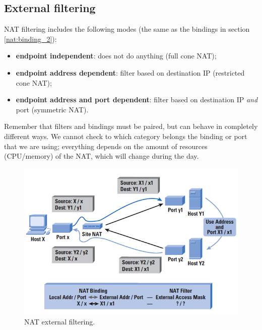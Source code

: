 
\subsection{External filtering}
NAT filtering includes the following modes (the same as the bindings in section \ref{nat:binding_2}):

\begin{itemize}
    \item \textbf{endpoint independent}: does not do anything (full cone NAT);
    \item \textbf{endpoint address dependent}: filter based on destination IP (restricted cone NAT);
    \item \textbf{endpoint address and port dependent}: filter based on destination IP \textit{and} port (symmetric NAT).
\end{itemize}

Remember that filters and bindings must be paired, but can behave in completely different ways. We cannot check to which category belongs the binding or port that we are using; everything depends on the amount of resources (CPU/memory) of the NAT, which will change during the day.

\begin{figure}[h]
    \centering
    \includegraphics[scale=0.7]{img/nat_ext_filtering.png}
    \decoRule
    \caption{NAT external filtering.}
    \label{fig:nat_ext_filtering}
\end{figure}


